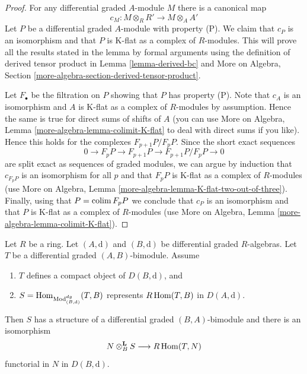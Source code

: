 \begin{proof}
For any differential graded $A$-module $M$ there is a canonical map
$$
c_M : M \otimes_R R' \longrightarrow M \otimes_A A'
$$
Let $P$ be a differential graded $A$-module with property (P).
We claim that $c_P$ is an isomorphism and that $P$ is K-flat
as a complex of $R$-modules. This will prove all the results
stated in the lemma by formal arguments using the definition
of derived tensor product in Lemma \ref{lemma-derived-bc} and
More on Algebra, Section \ref{more-algebra-section-derived-tensor-product}.

\medskip\noindent
Let $F_\bullet$ be the filtration on $P$ showing that $P$ has property (P).
Note that $c_A$ is an isomorphism and $A$ is K-flat as a complex
of $R$-modules by assumption. Hence the same is true for
direct sums of shifts of $A$ (you can use
More on Algebra, Lemma \ref{more-algebra-lemma-colimit-K-flat}
to deal with direct sums if you like).
Hence this holds for the complexes $F_{p + 1}P/F_pP$.
Since the short exact sequences
$$
0 \to F_pP \to F_{p + 1}P \to F_{p + 1}P/F_pP \to 0
$$
are split exact as sequences of graded modules, we can argue
by induction that $c_{F_pP}$ is an isomorphism for all $p$
and that $F_pP$ is K-flat as a complex of $R$-modules (use
More on Algebra, Lemma \ref{more-algebra-lemma-K-flat-two-out-of-three}).
Finally, using that $P = \mathop{\mathrm{colim}}\nolimits F_pP$ we conclude that
$c_P$ is an isomorphism and that $P$ is K-flat
as a complex of $R$-modules (use
More on Algebra, Lemma \ref{more-algebra-lemma-colimit-K-flat}).
\end{proof}

\begin{lemma}
\label{lemma-RHom-is-tensor}
Let $R$ be a ring.
Let $(A, \text{d})$ and $(B, \text{d})$ be differential graded $R$-algebras.
Let $T$ be a differential graded $(A, B)$-bimodule.
Assume
\begin{enumerate}
\item $T$ defines a compact object of $D(B, \text{d})$, and
\item $S = \mathop{\mathrm{Hom}}\nolimits_{\text{Mod}^{dg}_{(B, \text{d})}}(T, B)$
represents $R\mathop{\mathrm{Hom}}\nolimits(T, B)$ in $D(A, \text{d})$.
\end{enumerate}
Then $S$ has a structure of a differential graded $(B, A)$-bimodule
and there is an isomorphism
$$
N \otimes_B^\mathbf{L} S \longrightarrow R\mathop{\mathrm{Hom}}\nolimits(T, N)
$$
functorial in $N$ in $D(B, \text{d})$.
\end{lemma}

